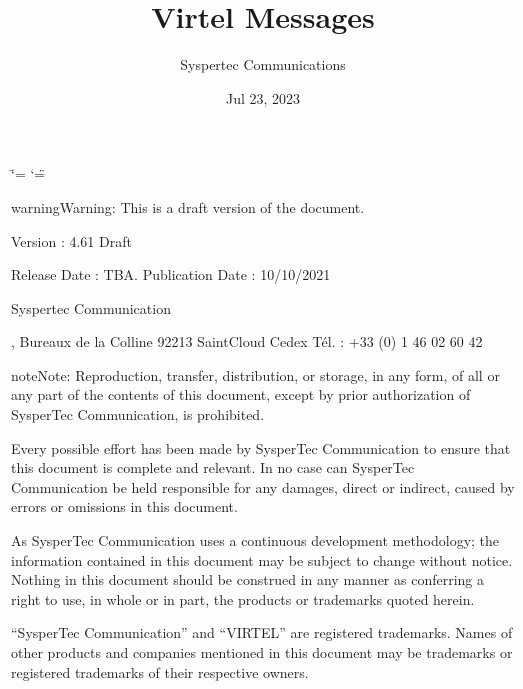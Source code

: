 \documentclass[letterpaper,10pt,english]{sphinxmanual}
\title{Virtel Messages}
\date{Jul 23, 2023}
\author{Syspertec Communications}
\begin{document}
\ifdefined\shorthandoff
  \ifnum\catcode`\=\string=\active\shorthandoff{=}\fi
  \ifnum\catcode`\"=\active{}\fi
\fi

\pagestyle{empty}
\sphinxmaketitle
\pagestyle{plain}
\sphinxtableofcontents
\pagestyle{normal}
\label{\detokenize{messages::doc}}


\sphinxAtStartPar
{}

\sphinxAtStartPar
{}

\begin{sphinxadmonition}{warning}{Warning:}
\sphinxAtStartPar
This is a draft version of the document.
\end{sphinxadmonition}

\sphinxAtStartPar
Version : 4.61 Draft

\sphinxAtStartPar
Release Date : TBA. Publication Date : 10/10/2021

\sphinxAtStartPar
Syspertec Communication

, Bureaux de la Colline 92213 Saint\sphinxhyphen{}Cloud Cedex Tél. : +33 (0) 1 46 02 60 42

\sphinxAtStartPar
{}

\begin{sphinxadmonition}{note}{Note:}
\sphinxAtStartPar
Reproduction, transfer, distribution, or storage, in any form, of all or any part of
the contents of this document, except by prior authorization of SysperTec
Communication, is prohibited.

\sphinxAtStartPar
Every possible effort has been made by SysperTec Communication to ensure that this document
is complete and relevant. In no case can SysperTec Communication be held responsible for
any damages, direct or indirect, caused by errors or omissions in this document.

\sphinxAtStartPar
As SysperTec Communication uses a continuous development methodology; the information
contained in this document may be subject to change without notice. Nothing in this
document should be construed in any manner as conferring a right to use, in whole or in
part, the products or trademarks quoted herein.

\sphinxAtStartPar
“SysperTec Communication” and “VIRTEL” are registered trademarks. Names of other products
and companies mentioned in this document may be trademarks or registered trademarks of
their respective owners.
\end{sphinxadmonition}
\end{document}
